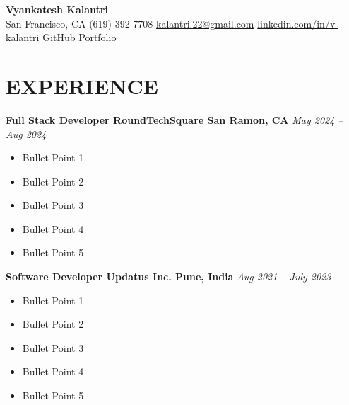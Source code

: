 \documentclass[letterpaper,10pt]{article}
\begin{document}
\begin{center}
    {\huge \textbf{Vyankatesh Kalantri}} \\
    \vspace{0.2cm}
    \faMapMarker{} San Francisco, CA \hspace{1em}
    \faPhone{} (619)-392-7708 \hspace{1em}
    \faEnvelope{} \href{mailto:kalantri.22@gmail.com}{kalantri.22@gmail.com} \hspace{1em}
    \faLinkedin{} \href{https://www.linkedin.com/in/v-kalantri}{linkedin.com/in/v-kalantri} \hspace{1em}
    \vspace{0.2cm}
    \faGithub{} \href{https://github.com/Kalantri007}{GitHub } \hspace{1em}
    \faGlobe{} \href{https://kalantri007.github.io/Portfolio/}{Portfolio}
\end{center}

\section*{\large EXPERIENCE}

\noindent
\textbf{Full Stack Developer \textbar{} RoundTechSquare \textbar{} San Ramon, CA} \hfill \textit{May 2024 -- Aug 2024}
\begin{itemize}[itemsep=0cm, topsep=0.1cm]
\justifying
    \item Bullet Point 1
    \item Bullet Point 2
    \item Bullet Point 3
    \item Bullet Point 4
    \item Bullet Point 5
\end{itemize}

\vspace{0.2cm}

\noindent
\textbf{Software Developer \textbar{} Updatus Inc. \textbar{} Pune, India} \hfill \textit{Aug 2021 -- July 2023}
\begin{itemize}[itemsep=0cm, topsep=0.1cm]
\justifying
    \item Bullet Point 1
    \item Bullet Point 2
    \item Bullet Point 3
    \item Bullet Point 4
    \item Bullet Point 5
\end{itemize}

\vspace{0.2cm}
\end{document}
